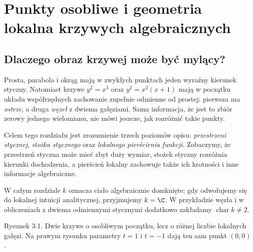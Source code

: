 \chapter{Punkty osobliwe i geometria lokalna krzywych algebraicznych}
\label{ch:osobliwosci}

\providecommand{\atlasref}[2]{#2}


\section{Dlaczego obraz krzywej może być mylący?}

Prosta, parabola i okrąg mają w zwykłych punktach jeden wyraźny
kierunek styczny. Natomiast krzywe $y^2=x^3$ oraz
$y^2=x^2(x+1)$ mają w początku układu współrzędnych
zachowanie zupełnie odmienne od prostej: pierwsza ma
\emph{ostrze}, a druga \emph{węzeł} z dwiema gałęziami.
Sama informacja, że jest to zbiór zerowy jednego wielomianu,
nie mówi jeszcze, jak rozróżnić takie punkty.

Celem tego rozdziału jest zrozumienie trzech poziomów opisu:
\emph{przestrzeni stycznej}, \emph{stożka stycznego} oraz
\emph{lokalnego pierścienia funkcji}. Zobaczymy, że przestrzeń
styczna może mieć zbyt duży wymiar, stożek styczny rozróżnia
kierunki dochodzenia, a pierścień lokalny zachowuje także
ich krotności i inne informacje algebraiczne.

W całym rozdziale $k$ oznacza ciało algebraicznie domknięte;
gdy odwołujemy się do lokalnej intuicji analitycznej,
przyjmujemy $k=\C$. W przykładzie węzła i w obliczeniach
z dwiema odmiennymi stycznymi dodatkowo zakładamy
$\operatorname{char}k\ne2$.

\begin{center}

\small Rysunek 3.1. Dwie krzywe o osobliwym początku, lecz o różnej
liczbie lokalnych gałęzi. Na prawym rysunku parametry $t=1$ i $t=-1$
dają ten sam punkt $(0,0)$.
\end{center}

